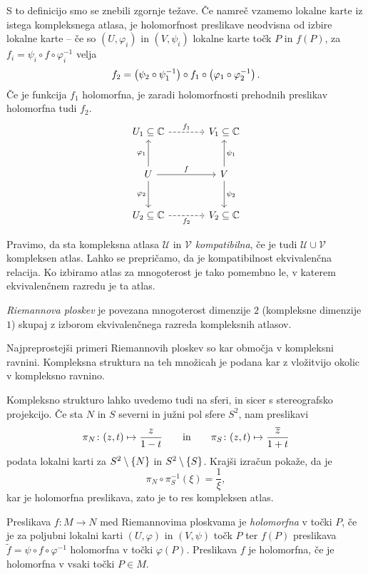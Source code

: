 S to definicijo smo se znebili zgornje težave. Če namreč vzamemo
lokalne karte iz istega kompleksnega atlasa, je holomorfnost
preslikave neodvisna od izbire lokalne karte -- če so
$(U, \varphi_i)$ in $(V, \psi_i)$ lokalne karte točk $P$ in $f(P)$,
za $f_i = \psi_i \circ f \circ \varphi_i^{-1}$ velja
\[
f_2 = \left(\psi_2 \circ \psi_1^{-1}\right) \circ
f_1 \circ \left(\varphi_1 \circ \varphi_2^{-1}\right).
\]
Če je funkcija $f_1$ holomorfna, je zaradi holomorfnosti prehodnih
preslikav holomorfna tudi $f_2$.
\[
\begin{tikzcd}[column sep=large, row sep=large]
U_1 \subseteq \C \arrow[r, dashrightarrow, "f_1"] &
V_1 \subseteq \C
\\
U \arrow[r, "f"] \arrow[d, "\varphi_2"'] \arrow[u, "\varphi_1"] &
V \arrow[u, "\psi_1"'] \arrow[d, "\psi_2"] \\
U_2 \subseteq \C \arrow[r, dashrightarrow, "f_2"'] &
V_2 \subseteq \C
\end{tikzcd}
\]

Pravimo, da sta kompleksna atlasa $\mathcal{U}$ in $\mathcal{V}$
\emph{kompatibilna}, če je tudi $\mathcal{U} \cup \mathcal{V}$
kompleksen atlas. Lahko se prepričamo, da je kompatibilnost
ekvivalenčna relacija. Ko izbiramo atlas za mnogoterost je tako
pomembno le, v katerem ekvivalenčnem razredu je ta atlas.

\begin{definicija}
\emph{Riemannova ploskev} je povezana mnogoterost dimenzije $2$
(kompleksne dimenzije $1$) skupaj z izborom ekvivalenčnega razreda
kompleksnih atlasov.
\end{definicija}

\begin{primer}
Najpreprostejši primeri Riemannovih ploskev so kar območja v
kompleksni ravnini. Kompleksna struktura na teh množicah je podana
kar z vložitvijo okolic v kompleksno ravnino.

Kompleksno strukturo lahko uvedemo tudi na sferi, in sicer s
stereografsko projekcijo. Če sta $N$ in $S$ severni in južni pol
sfere $S^2$, nam preslikavi
\[
\pi_N \colon (z, t) \mapsto \frac{z}{1-t}
\qquad \text{in} \qquad
\pi_S \colon (z, t) \mapsto \frac{\overline{z}}{1+t}
\]
podata lokalni karti za $S^2 \setminus \left\{N\right\}$ in
$S^2 \setminus \left\{S\right\}$. Krajši izračun pokaže, da je
\[
\pi_N \circ \pi_S^{-1}(\xi) = \frac{1}{\xi},
\]
kar je holomorfna preslikava, zato je to res kompleksen atlas.
\end{primer}

\begin{definicija}
Preslikava $f \colon M \to N$ med Riemannovima ploskvama je
\emph{holomorfna} v točki $P$, če je za poljubni lokalni karti
$(U, \varphi)$ in $(V, \psi)$ točk $P$ ter $f(P)$ preslikava
$\tilde{f} = \psi \circ f \circ \varphi^{-1}$ holomorfna v točki
$\varphi(P)$. Preslikava $f$ je holomorfna, če je holomorfna v
vsaki točki $P \in M$.
\end{definicija}

